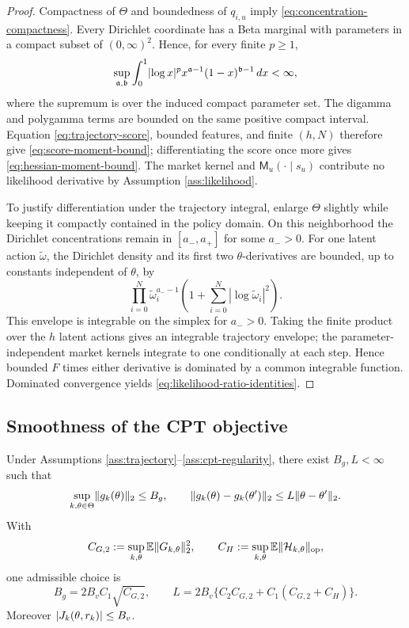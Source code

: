 \begin{proof}
Compactness of $\Theta$ and boundedness of $q_{i,u}$ imply \eqref{eq:concentration-compactness}.  Every Dirichlet coordinate has a Beta marginal with parameters in a compact subset of $(0,\infty)^2$.  Hence, for every finite $p\ge1$,
\[
 \sup_{\mathfrak a,\mathfrak b}\int_0^1
 \lvert\log x\rvert^p x^{\mathfrak a-1}(1-x)^{\mathfrak b-1}\,dx<\infty,
\]
where the supremum is over the induced compact parameter set.  The digamma and polygamma terms are bounded on the same positive compact interval.  Equation \eqref{eq:trajectory-score}, bounded features, and finite $(h,N)$ therefore give \eqref{eq:score-moment-bound}; differentiating the score once more gives \eqref{eq:hessian-moment-bound}.  The market kernel and $\mathsf M_u(\cdot\mid s_u)$ contribute no likelihood derivative by Assumption \ref{ass:likelihood}.

To justify differentiation under the trajectory integral, enlarge $\Theta$ slightly while keeping it compactly contained in the policy domain.  On this neighborhood the Dirichlet concentrations remain in $[a_-,a_+]$ for some $a_->0$.  For one latent action $\widetilde\omega$, the Dirichlet density and its first two $\theta$-derivatives are bounded, up to constants independent of $\theta$, by
\[
 \prod_{i=0}^{N}\widetilde\omega_i^{a_- -1}
 \left(1+\sum_{i=0}^{N}|\log\widetilde\omega_i|^2\right).
\]
This envelope is integrable on the simplex for $a_->0$.  Taking the finite product over the $h$ latent actions gives an integrable trajectory envelope; the parameter-independent market kernels integrate to one conditionally at each step.  Hence bounded $F$ times either derivative is dominated by a common integrable function.  Dominated convergence yields \eqref{eq:likelihood-ratio-identities}.
\end{proof}

\subsection{Smoothness of the CPT objective}

\begin{lemma}\label{lem:cpt-smoothness}
Under Assumptions \ref{ass:trajectory}--\ref{ass:cpt-regularity}, there exist $B_g,L<\infty$ such that
\begin{equation}\label{eq:uniform-gradient-smoothness}
 \sup_{k,\theta\in\Theta}\lVert g_k(\theta)\rVert_2\le B_g,
 \qquad
 \lVert g_k(\theta)-g_k(\theta')\rVert_2\le L\lVert\theta-\theta'\rVert_2.
\end{equation}
With
\[
 C_{G,2}:=\sup_{k,\theta}\mathbb E\lVert G_{k,\theta}\rVert_2^2,
 \qquad
 C_H:=\sup_{k,\theta}\mathbb E\lVert\mathcal H_{k,\theta}\rVert_{\mathrm{op}},
\]
one admissible choice is
\begin{equation}\label{eq:smoothness-constant}
 B_g=2B_vC_1\sqrt{C_{G,2}},
 \qquad
 L=2B_v\{C_2C_{G,2}+C_1(C_{G,2}+C_H)\}.
\end{equation}
Moreover $\lvert J_k(\theta,r_k)\rvert\le B_v$.
\end{lemma}

